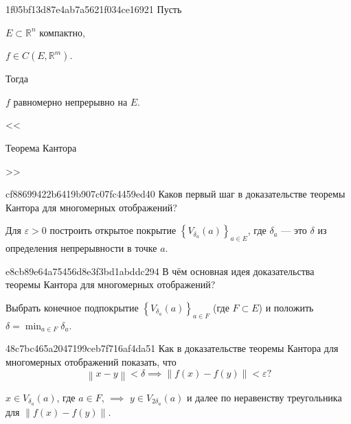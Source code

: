 \begin{note}{1f05bf13d87e4ab7a5621f034ce16921}
    Пусть \begin{icloze}{2}\({ E \subset \mathbb R^{n} }\) компактно,\end{icloze}\: \begin{icloze}{3}\({ f \in C(E, \mathbb R^{m}) }\).\end{icloze}
    Тогда \begin{icloze}{1}\({ f }\) равномерно непрерывно на \({ E }\).\end{icloze}

    \begin{center}
        \tiny
        <<\begin{icloze}{4}Теорема Кантора\end{icloze}>>
    \end{center}
\end{note}

\begin{note}{cf88699422b6419b907c07fc4459ed40}
    Каков первый шаг в доказательстве теоремы Кантора для многомерных отображений?

    \begin{cloze}{1}
        Для \({ \varepsilon > 0 }\) построить открытое покрытие \({ \left\{ V_{\delta_a}(a) \right\}_{a \in E} }\), где \({ \delta_a }\) --- это \({ \delta }\) из определения непрерывности в точке \({ a }\).
    \end{cloze}
\end{note}

\begin{note}{e8cb89e64a75456d8e3f3bd1abddc294}
    В чём основная идея доказательства теоремы Кантора для многомерных отображений?

    \begin{cloze}{1}
        Выбрать конечное подпокрытие \({ \left\{ V_{\delta_a}(a) \right\}_{a \in F} }\) (где \({ F \subset E }\)) и положить \({ \displaystyle \delta = \min_{a \in F} \delta_a }\).
    \end{cloze}
\end{note}

\begin{note}{48c7bc465a2047199ceb7f716af4da51}
    Как в доказательстве теоремы Кантора для многомерных отображений показать, что
    \[
        \displaystyle \left\lVert x - y \right\rVert < \delta \implies \left\lVert f(x) - f(y) \right\rVert < \varepsilon?
    \]

    \begin{cloze}{1}
        \({ x \in V_{\delta_a}(a) }\), где \({ a \in F }\), \({ \implies }\) \({ y \in V_{2\delta_a}(a) }\) и далее по неравенству треугольника для \({ \left\lVert f(x) - f(y) \right\rVert }\).
    \end{cloze}
\end{note}

